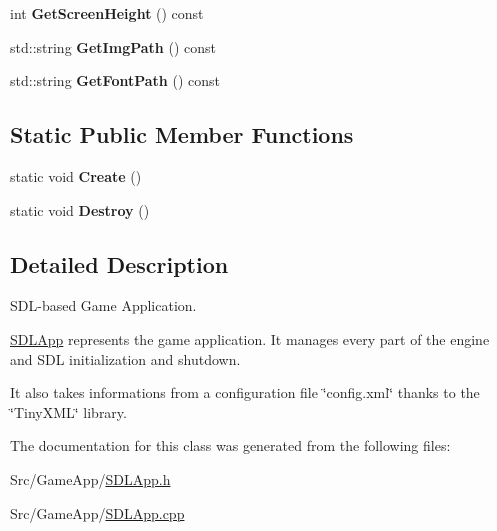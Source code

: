 \begin{DoxyCompactItemize}
\item 
\hypertarget{classSDLApp_aea8dbcb66976382438097fa98c00908c}{int {\bfseries Get\-Screen\-Height} () const }\label{classSDLApp_aea8dbcb66976382438097fa98c00908c}

\item 
\hypertarget{classSDLApp_ab9686ae6baa123a9cbc39784f92b1734}{std\-::string {\bfseries Get\-Img\-Path} () const }\label{classSDLApp_ab9686ae6baa123a9cbc39784f92b1734}

\item 
\hypertarget{classSDLApp_a5cc3377f79fc145c4f5a4159b9e5268e}{std\-::string {\bfseries Get\-Font\-Path} () const }\label{classSDLApp_a5cc3377f79fc145c4f5a4159b9e5268e}

\end{DoxyCompactItemize}
\subsection*{Static Public Member Functions}
\begin{DoxyCompactItemize}
\item 
\hypertarget{classSDLApp_a0a9244bf05905977e1f0f4ae86324e76}{static void {\bfseries Create} ()}\label{classSDLApp_a0a9244bf05905977e1f0f4ae86324e76}

\item 
\hypertarget{classSDLApp_abd1758d8354f098f6ab68d438f47e026}{static void {\bfseries Destroy} ()}\label{classSDLApp_abd1758d8354f098f6ab68d438f47e026}

\end{DoxyCompactItemize}


\subsection{Detailed Description}
S\-D\-L-\/based Game Application. 

\hyperlink{classSDLApp}{S\-D\-L\-App} represents the game application. It manages every part of the engine and S\-D\-L initialization and shutdown.

It also takes informations from a configuration file \char`\"{}config.\-xml\char`\"{} thanks to the \char`\"{}\-Tiny\-X\-M\-L\char`\"{} library. 

The documentation for this class was generated from the following files\-:\begin{DoxyCompactItemize}
\item 
Src/\-Game\-App/\hyperlink{SDLApp_8h}{S\-D\-L\-App.\-h}\item 
Src/\-Game\-App/\hyperlink{SDLApp_8cpp}{S\-D\-L\-App.\-cpp}\end{DoxyCompactItemize}
